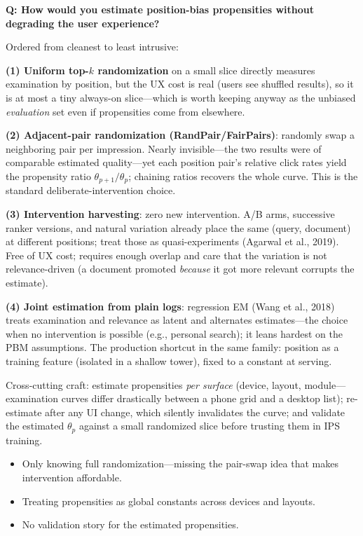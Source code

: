 \begin{interviewq}
\textbf{Q: How would you estimate position-bias propensities without degrading the user experience?}

 \quad {} \quad \badgefreq{\freqmed}

\stronganswer

Ordered from cleanest to least intrusive:

\textbf{(1) Uniform top-$k$ randomization} on a small slice directly measures examination by position, but the UX cost is real (users see shuffled results), so it is at most a tiny always-on slice---which is worth keeping anyway as the unbiased \textit{evaluation} set even if propensities come from elsewhere.

\textbf{(2) Adjacent-pair randomization (RandPair/FairPairs)}: randomly swap a neighboring pair per impression. Nearly invisible---the two results were of comparable estimated quality---yet each position pair's relative click rates yield the propensity ratio $\theta_{p+1}/\theta_p$; chaining ratios recovers the whole curve. This is the standard deliberate-intervention choice.

\textbf{(3) Intervention harvesting}: zero new intervention. A/B arms, successive ranker versions, and natural variation already place the same (query, document) at different positions; treat those as quasi-experiments (Agarwal et al., 2019). Free of UX cost; requires enough overlap and care that the variation is not relevance-driven (a document promoted \textit{because} it got more relevant corrupts the estimate).

\textbf{(4) Joint estimation from plain logs}: regression EM (Wang et al., 2018) treats examination and relevance as latent and alternates estimates---the choice when no intervention is possible (e.g., personal search); it leans hardest on the PBM assumptions. The production shortcut in the same family: position as a training feature (isolated in a shallow tower), fixed to a constant at serving.

Cross-cutting craft: estimate propensities \textit{per surface} (device, layout, module---examination curves differ drastically between a phone grid and a desktop list); re-estimate after any UI change, which silently invalidates the curve; and validate the estimated $\theta_p$ against a small randomized slice before trusting them in IPS training.

\redflags
\begin{itemize}
    \item Only knowing full randomization---missing the pair-swap idea that makes intervention affordable.
    \item Treating propensities as global constants across devices and layouts.
    \item No validation story for the estimated propensities.
\end{itemize}


\end{interviewq}
